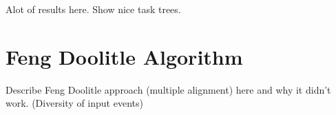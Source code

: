 Alot of results here. Show nice task trees.

\section{Feng Doolitle Algorithm}
Describe Feng Doolitle approach (multiple alignment) here and why it didn't work. (Diversity of input events)

